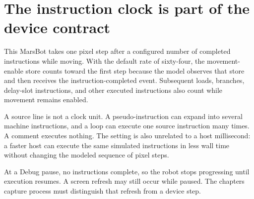 \section{The instruction clock is part of the device
  contract}\label{006-marsbot-square-p02-the-instruction-clock-is-part-of-the-device-contract}

This MarsBot takes one pixel step after a configured number of completed
instructions while moving. With the default rate of sixty-four, the
movement-enable store counts toward the first step because the model
observes that store and then receives the instruction-completed event.
Subsequent loads, branches, delay-slot instructions, and other executed
instructions also count while movement remains enabled.

A source line is not a clock unit. A pseudo-instruction can expand into
several machine instructions, and a loop can execute one source
instruction many times. A comment executes nothing. The setting is also
unrelated to a host millisecond: a faster host can execute the same
simulated instructions in less wall time without changing the modeled
sequence of pixel steps.

At a Debug pause, no instructions complete, so the robot stops
progressing until execution resumes. A screen refresh may still occur
while paused. The chapter\textquotesingle s capture process must
distinguish that refresh from a device step.
